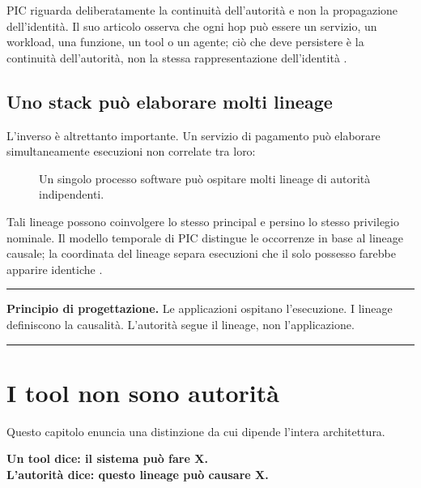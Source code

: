 \documentclass[10pt,oneside,openany]{book}
\newcommand{\principle}[1]{%
  \vspace{4pt}
  \noindent\begin{minipage}{\linewidth}
  \hrule\vspace{5pt}
  \small\sffamily\raggedright\textbf{Principio di progettazione.} #1
  \vspace{5pt}\hrule
  \end{minipage}\vspace{4pt}
}
\begin{document}
PIC riguarda deliberatamente la continuità dell'autorità e non la propagazione dell'identità. Il suo articolo osserva che ogni hop può essere un servizio, un workload, una funzione, un tool o un agente; ciò che deve persistere è la continuità dell'autorità, non la stessa rappresentazione dell'identità \cite{gallo2026pic}.

\section{Uno stack può elaborare molti lineage}
L'inverso è altrettanto importante. Un servizio di pagamento può elaborare simultaneamente esecuzioni non correlate tra loro:

\begin{figure}[ht]
\centering
{}
\caption{Un singolo processo software può ospitare molti lineage di autorità indipendenti.}
\end{figure}

Tali lineage possono coinvolgere lo stesso principal e persino lo stesso privilegio nominale. Il modello temporale di PIC distingue le occorrenze in base al lineage causale; la coordinata del lineage separa esecuzioni che il solo possesso farebbe apparire identiche \cite{gallo2026pic}.

\principle{Le applicazioni ospitano l'esecuzione. I lineage definiscono la causalità. L'autorità segue il lineage, non l'applicazione.}

\chapter{I tool non sono autorità}

Questo capitolo enuncia una distinzione da cui dipende l'intera architettura.

\begin{center}
\sffamily\bfseries
Un tool dice: il sistema può fare X.\\
L'autorità dice: questo lineage può causare X.
\end{center}
\end{document}
